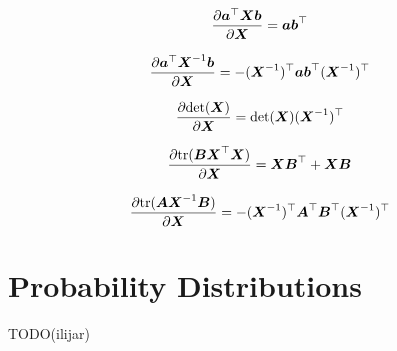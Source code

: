 \documentclass{article}
\begin{document}
\begin{align}
  \frac{\partial \vec a\T \mat X \vec b}{\partial \mat X}
    = \vec a \vec b\T
\end{align}

\begin{align}
  \frac{\partial \vec a\T \mat X\inv \vec b}{\partial \mat X}
    = - (\mat X\inv)\T \vec a \vec b\T (\mat X\inv)\T
\end{align}

\begin{align}
  \frac{\partial \determ{\mat X}}{\partial \mat X}
    = \determ{\mat X} (\mat X\inv)\T
\end{align}

\begin{align}
  \frac{\partial \tr{\mat B \mat X\T \mat X}}{\partial \mat X}
    = \mat X \mat B\T + \mat X \mat B
\end{align}

\begin{align}
  \frac{\partial \tr{\mat A \mat X\inv \mat B}}{\partial \mat X}
    = -(\mat X\inv)\T \mat A\T \mat B\T (\mat X\inv)\T
\end{align}

\newpage
\section{Probability Distributions}
TODO(ilijar)
\end{document}
